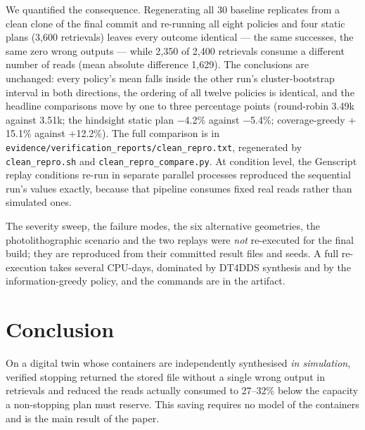 \documentclass[conference,onecolumn,11pt]{IEEEtran}
\begin{document}
We quantified the consequence.  Regenerating all 30 baseline replicates from a clean clone of the final
commit and re-running all eight policies and four static plans (3{,}600 retrievals) leaves every outcome
identical --- the same successes, the same zero wrong outputs --- while 2{,}350 of 2{,}400 retrievals consume
a different number of reads (mean absolute difference 1{,}629).  The conclusions are unchanged: every
policy's mean falls inside the other run's cluster-bootstrap interval in both directions, the ordering of
all twelve policies is identical, and the headline comparisons move by one to three percentage points
(round-robin 3.49k against 3.51k; the hindsight static plan $-$4.2\% against $-$5.4\%; coverage-greedy
$+$15.1\% against $+$12.2\%).  The full comparison is in
\texttt{evidence/}\allowbreak\texttt{verification\_reports/}\allowbreak\texttt{clean\_repro.txt},
regenerated by \texttt{clean\_repro.sh} and \texttt{clean\_repro\_}\allowbreak\texttt{compare.py}.  At
condition level, the Genscript replay conditions re-run in separate parallel processes reproduced the sequential run's values
exactly, because that pipeline consumes fixed real reads rather than simulated ones.

The severity sweep, the failure modes, the six alternative geometries, the photolithographic scenario
and the two replays were \emph{not} re-executed for the final build; they are reproduced from their
committed result files and seeds.  A full re-execution takes several CPU-days, dominated by DT4DDS
synthesis and by the information-greedy policy, and the commands are in the artifact.


\section{Conclusion}
On a digital twin whose containers are independently synthesised \emph{in simulation}, verified
stopping returned the stored file without a single wrong output in \SafeN{} retrievals and reduced the
reads actually consumed to 27--32\% below the capacity a non-stopping plan must reserve.  This saving
requires no model of the containers and is the main result of the paper.
\end{document}
